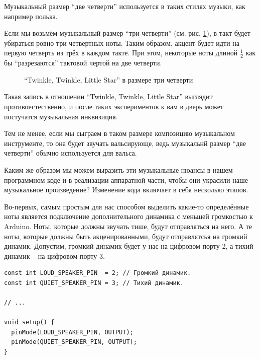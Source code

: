\documentclass[a4paper,twoside]{book}
\begin{document}
Музыкальный размер ``две четверти'' используется в таких стилях музыки, как
например полька.

Если мы возьмём музыкальный размер ``три четверти''
(см. рис. \ref{fig:lilypond-musical-scale-example-4}), в такт будет убираться
ровно три четвертных ноты.  Таким образом, акцент будет идти на первую четверть
из трёх в каждом такте.  При этом, некоторые ноты длиной $\frac{1}{2}$ как бы
``разрезаются'' тактовой чертой на две четверти.

\begin{figure}[ht]
  \caption{``Twinkle, Twinkle, Little Star'' в размере три четверти}
  \centering
  \label{fig:lilypond-musical-scale-example-4}
\end{figure}

Такая запись в отношении ``Twinkle, Twinkle, Little Star'' выглядит
противоестественно, и после таких экспериментов к вам в дверь может постучатся
музыкальная инквизиция.

Тем не менее, если мы сыграем в таком размере композицию музыкальном
инструменте, то она будет звучать вальсирующе, ведь музыкальнй размер ``две
четверти'' обычно используется для вальса.

Каким же образом мы можем выразить эти музыкальные нюансы в нашем программном
коде и в реализации аппаратной части, чтобы они украсили наше музыкальное
произведение?  Изменение кода включает в себя несколько этапов.

Во-первых, самым простым для нас способом выделить какие-то определённые ноты
является подключение дополнительного динамика с меньшей громкостью к Arduino.
Ноты, которые должны звучать тише, будут отправляться на него.  А те ноты,
которые должны быть акценированными, будут отправлятсья на громкий динамик.
Допустим, громкий динамик будет у нас на цифровом порту 2, а тихий динамик -- на
цифровом порту 3.

\begin{verbatim}
const int LOUD_SPEAKER_PIN  = 2; // Громкий динамик.
const int QUIET_SPEAKER_PIN = 3; // Тихий динамик.

// ...

void setup() {
  pinMode(LOUD_SPEAKER_PIN, OUTPUT);
  pinMode(QUIET_SPEAKER_PIN, OUTPUT);
}
\end{verbatim}
\end{document}
